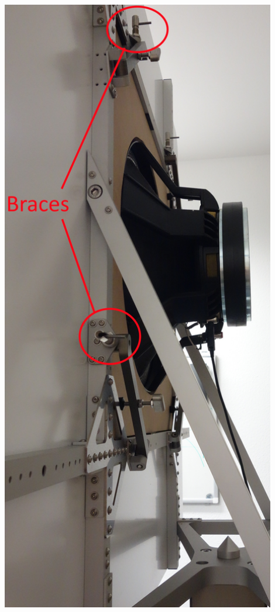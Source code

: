\documentclass{report}
\begin{document}
\begin{appendices}
\begin{minipage}{0.5\textwidth}
\begin{center}
    \captionsetup{hypcap=false}
    \label{fig:baffleclamp}
\end{center}
\end{minipage}
\begin{minipage}{0.5\textwidth}
\begin{center}
	\includegraphics[width=0.9\textwidth]{Appendix/baffle_side}
    \captionsetup{hypcap=false}
    \label{fig:baffleside}
\end{center}
\end{minipage}


\end{appendices}
\end{document}
